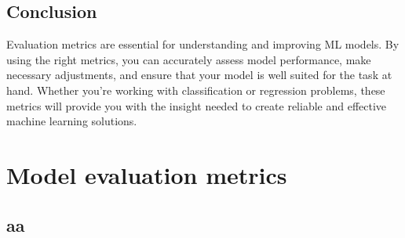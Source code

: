 \documentclass[11pt,spanish]{article}
\begin{document}
\begin{multicols}{2}
\subsection{Conclusion}
Evaluation metrics are essential for understanding and improving ML models. By using the right metrics, you can accurately assess model performance, make necessary adjustments, and ensure that your model is well suited for the task at hand. Whether you're working with classification or regression problems, these metrics will provide you with the insight needed to create reliable and effective machine learning solutions.









\section{Model evaluation metrics}

\subsection{aa}






\end{multicols}
\end{document}
